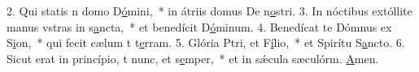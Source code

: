 2. Qui statis n domo D\uline{ó}mini,~* in átriis domus De n\uline{o}stri.
3. In nóctibus extóllite manus vstras in s\uline{a}ncta,~* et benedícit D\uline{ó}minum.
4. Benedícat te Dómnus ex S\uline{i}on,~* qui fecit cælum t t\uline{e}rram.
5. Glória Ptri, et F\uline{í}lio,~* et Spirítu S\uline{a}ncto.
6. Sicut erat in princípio, t nunc, et s\uline{e}mper,~* et in sǽcula sæculórm. \uline{A}men.
